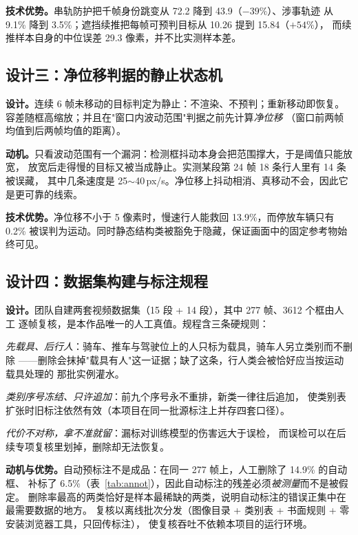 \documentclass[11pt,a4paper]{ctexart}
\begin{document}
\textbf{技术优势。}串轨防护把千帧身份跳变从 72.2 降到 43.9（$-39\%$）、涉事轨迹
从 9.1\% 降到 3.5\%；遮挡续推把每帧可预判目标从 10.26 提到 15.84（$+54\%$），
而续推样本自身的中位误差 29.3 像素，并不比实测样本差。

\subsection{设计三：净位移判据的静止状态机}

\textbf{设计。}连续 6 帧未移动的目标判定为静止：不渲染、不预判；重新移动即恢复。
容差随框高缩放；并且在"窗口内波动范围"判据之前先计算\emph{净位移}
（窗口前两帧均值到后两帧均值的距离）。

\textbf{动机。}只看波动范围有一个漏洞：检测框抖动本身会把范围撑大，于是阈值只能放宽，
放宽后走得慢的目标又被当成静止。实测某段第 24 帧 18 条行人里有 14 条被误藏，
其中几条速度是 25$\sim$40\,px/s。净位移上抖动相消、真移动不会，因此它是更可靠的线索。

\textbf{技术优势。}净位移不小于 5 像素时，慢速行人能救回 13.9\%，而停放车辆只有
0.2\% 被误判为运动。同时静态结构类被豁免于隐藏，保证画面中的固定参考物始终可见。

\subsection{设计四：数据集构建与标注规程}

\textbf{设计。}团队自建两套视频数据集（15 段 + 14 段），其中 277 帧、3612 个框由人工
逐帧复核，是本作品唯一的人工真值。规程含三条硬规则：

\emph{先载具、后行人}：骑车、推车与驾驶位上的人只标为载具，骑车人另立类别而不删除
——删除会抹掉"载具有人"这一证据；缺了这条，行人类会被恰好应当按运动载具处理的
那批实例灌水。

\emph{类别序号冻结、只许追加}：前九个序号永不重排，新类一律往后追加，
使类别表扩张时旧标注依然有效（本项目在同一批源标注上并存四套口径）。

\emph{代价不对称，拿不准就留}：漏标对训练模型的伤害远大于误检，
而误检可以在后续专项复核里划掉，删除却无法恢复。

\textbf{动机与优势。}自动预标注不是成品：在同一 277 帧上，人工删除了 14.9\% 的自动框、
补标了 6.5\%（表~\ref{tab:annot}），因此自动标注的残差必须\emph{被测量}而不是被假定。
删除率最高的两类恰好是样本最稀缺的两类，说明自动标注的错误正集中在最需要数据的地方。
复核以离线批次分发（图像目录 + 类别表 + 书面规则 + 零安装浏览器工具，只回传标注），
使复核吞吐不依赖本项目的运行环境。
\end{document}
